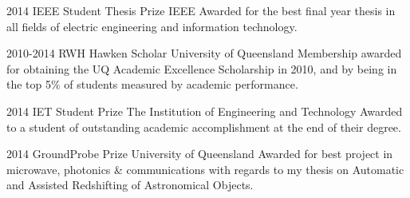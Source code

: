 \documentclass[]{friggeri-cv} %
\begin{document}
\begin{entrylist}
\entry
{2014}
{IEEE Student Thesis Prize}
{IEEE}
{Awarded for the best final year thesis in all fields of electric engineering and information technology.}
\end{entrylist}
\begin{entrylist}
\entry
{2010-2014}
{RWH Hawken Scholar}
{University of Queensland}
{Membership awarded for obtaining the UQ Academic Excellence Scholarship in 2010, and by being in the top 5\% of students measured by academic performance.}
\end{entrylist}
\begin{entrylist}
\entry
{2014}
{IET Student Prize}
{The Institution of Engineering and Technology}
{Awarded to a student of outstanding academic accomplishment at the end of their degree.}
\end{entrylist}
\begin{entrylist}
\entry
{2014}
{GroundProbe Prize}
{University of Queensland}
{Awarded for best project in microwave, photonics \& communications with regards to my thesis on Automatic and Assisted Redshifting of Astronomical Objects.}
\end{entrylist}
\end{document}
